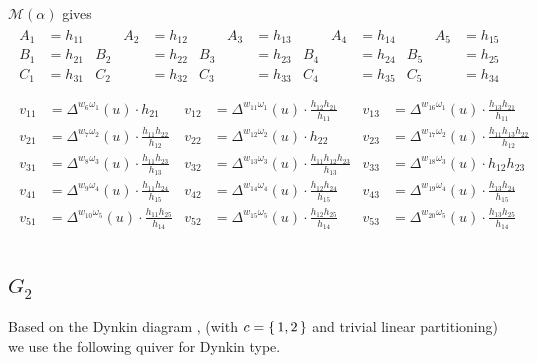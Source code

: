 \documentclass{amsart}
\theoremstyle{plain}
\theoremstyle{definition}
\theoremstyle{remark}
\newcommand{\conftoquiv}{\mathcal{M}}
\newcommand{\fundamentalweight}{\omega}
\newcommand{\genminor}[2]{\Delta^{{#1} \fundamentalweight_{#2}}}
\newcommand{\inldynkinGtwo}{\raisebox{-0.1ex}{}}
\begin{document}
  $\conftoquiv(\alpha)$ gives
  \begin{equation*}
    \begin{gathered}
      \begin{aligned}
        A_1 &= h_{11} &\qquad A_2 &= h_{12} &\qquad A_3 &= h_{13} &\qquad A_4 &= h_{14} &\qquad A_5 &= h_{15} \\
        B_1 &= h_{21} & B_2 &= h_{22} & B_3 &= h_{23} & B_4 &= h_{24} & B_5 &= h_{25} \\
        C_1 &= h_{31} & C_2 &= h_{32} & C_3 &= h_{33} & C_4 &= h_{35} & C_5 &= h_{34} \\
      \end{aligned}
      \\
      \begin{aligned}
        v_{1 1} &= \genminor{w_{6}}{1}(u) \cdot h_{21} & v_{1 2} &= \genminor{w_{11}}{1}(u) \cdot \frac{h_{12} h_{21} }{h_{11}} & v_{1 3} &= \genminor{w_{16}}{1}(u) \cdot \frac{h_{13} h_{21} }{h_{11}} \\
        v_{2 1} &= \genminor{w_{7}}{2}(u) \cdot \frac{h_{11} h_{22} }{h_{12}} & v_{2 2} &= \genminor{w_{12}}{2}(u) \cdot h_{22} & v_{2 3} &= \genminor{w_{17}}{2}(u) \cdot \frac{h_{11} h_{13} h_{22} }{h_{12}} \\
        v_{3 1} &= \genminor{w_{8}}{3}(u) \cdot \frac{h_{11} h_{23} }{h_{13}} & v_{3 2} &= \genminor{w_{13}}{3}(u) \cdot \frac{h_{11} h_{12} h_{23} }{h_{13}} & v_{3 3} &= \genminor{w_{18}}{3}(u) \cdot h_{12} h_{23} \\
        v_{4 1} &= \genminor{w_{9}}{4}(u) \cdot \frac{h_{11} h_{24} }{h_{15}} & v_{4 2} &= \genminor{w_{14}}{4}(u) \cdot \frac{h_{12} h_{24} }{h_{15}} & v_{4 3} &= \genminor{w_{19}}{4}(u) \cdot \frac{h_{13} h_{24} }{h_{15}} \\
        v_{5 1} &= \genminor{w_{10}}{5}(u) \cdot \frac{h_{11} h_{25} }{h_{14}} & v_{5 2} &= \genminor{w_{15}}{5}(u) \cdot \frac{h_{12} h_{25} }{h_{14}} & v_{5 3} &= \genminor{w_{20}}{5}(u) \cdot \frac{h_{13} h_{25} }{h_{14}} \\
      \end{aligned}
    \end{gathered}
  \end{equation*}

  \subsection{\texorpdfstring{$G_2$}{G\_2}}

  Based on the Dynkin diagram \inldynkinGtwo, (with $c = \set{1, 2}$ and
  trivial linear partitioning) we use the following quiver for Dynkin
  type.
\end{document}
